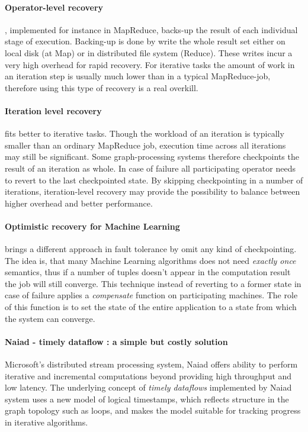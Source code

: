\paragraph{Operator-level recovery}, implemented for instance in MapReduce\cite{mapreduce}, backs-up the result of each individual stage of execution. Backing-up is done by write the whole result set either on local disk (at Map) or in distributed file system (Reduce). These writes incur a very high overhead for rapid recovery. For iterative tasks the amount of work in an iteration step is usually  much lower than in a typical MapReduce-job, therefore using this type of recovery is a real overkill.

\paragraph{Iteration level recovery} fits better to iterative tasks. Though the workload of an iteration is typically smaller than an ordinary MapReduce job, execution time across all iterations  may still be significant. Some graph-processing systems\cite{distgraphlab}\cite{pregel} therefore checkpoints the result of an iteration as whole. In case of failure all participating operator needs to revert to the last checkpointed state. By skipping checkpointing in a number of iterations, iteration-level recovery may provide the possibility to balance between higher overhead and better performance.

\paragraph{Optimistic recovery for Machine Learning}\cite{allroadsleadtorome} brings a different approach in fault tolerance by omit any kind of checkpointing. The idea is, that many Machine Learning algorithms does not need \textit{exactly once} semantics, thus if a number of tuples doesn't appear in the computation result the job will still converge.  This technique instead of reverting to a former state in case of failure applies a \textit{compensate} function on participating machines. The role of this function is to set the state of the entire application to a state from which the system can converge.

\paragraph{Naiad - timely dataflow : a simple but costly solution}
Microsoft's  distributed stream processing system, Naiad\cite{naiad} offers ability to perform iterative and incremental computations beyond providing high throughput and low latency.
The underlying concept of \textit{timely dataflows} implemented by Naiad system uses a new model of logical timestamps, which reflects structure in the graph topology such as loops, and makes the model suitable  for tracking progress in iterative algorithms. 

